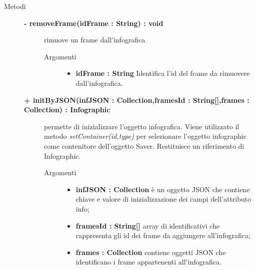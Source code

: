 \begin{description}
\item[Metodi] \hfill

		\begin{description}
		\item[\textbf{\color{blue}- removeFrame(idFrame : String) : void			}] \hfill
			rimuove un frame dall'infografica
			
		\begin{description}
			\item[Argomenti] \hfill
				\begin{itemize}
				
					\item \textbf{idFrame : String			} \hfill
						Identifica l'id del frame da rimuovere dall'infografica.
				\end{itemize}
		\end{description}

\end{description}

\begin{description}
		\item[\textbf{\color{blue}+ initByJSON(infJSON : Collection,framesId : String[],frames : Collection) : Infographic			}] \hfill
			permette di inizializzare l'oggetto infografica. Viene utilizzato il metodo \textit{setContainer(id,type)} per selezionare l'oggetto infographic come contenitore dell'oggetto Saver. Restituisce un riferimento di Infographic.
			
		\begin{description}
			\item[Argomenti] \hfill
				\begin{itemize}
				
					\item \textbf{infJSON : Collection			} \hfill
					è un oggetto JSON che contiene chiave e valore di inizializzazione dei campi dell'attributo info;
					\item \textbf{framesId : String[]			} \hfill
					array di identificativi che rappresenta gli id dei frame da aggiungere all'infografica;
					\item \textbf{frames : Collection			} \hfill
					contiene oggetti JSON che identificano i frame appartenenti all'infografica. 
				\end{itemize}
		\end{description}

\end{description}


\end{description}
